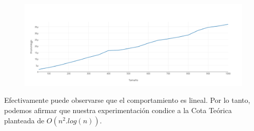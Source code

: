    \begin{figure}[h!]
   \begin{center}
 	\includegraphics[scale=0.4]{imagenes/ej3/n.png}
   \end{center}
 \end{figure}
 \newpage

	Efectivamente puede observarse que el comportamiento es lineal. Por lo tanto, podemos afirmar que nuestra experimentaci\'on condice a la Cota Te\'orica planteada de $O(n^2.log(n))$.